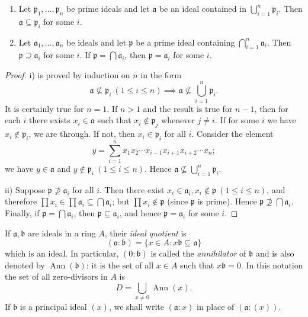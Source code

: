 \begin{proposition}\label{pro:prime avoidance}
\begin{enumerate}
    \item[i)] Let $\mathfrak{p}_1, \ldots, \mathfrak{p}_n$ be prime ideals and let $\mathfrak{a}$ be an ideal contained in $\bigcup_{i=1}^{n} \mathfrak{p}_i$. Then $\mathfrak{a} \subseteq \mathfrak{p}_i$ for some $i$.
    \item[ii)] Let $\mathfrak{a}_1, \ldots, \mathfrak{a}_n$ be ideals and let $\mathfrak{p}$ be a prime ideal containing $\bigcap_{i=1}^{n} \mathfrak{a}_i$. Then $\mathfrak{p} \supseteq \mathfrak{a}_i$ for some $i$. If $\mathfrak{p} = \bigcap \mathfrak{a}_i$, then $\mathfrak{p} = \mathfrak{a}_i$ for some $i$.
\end{enumerate}
\end{proposition}

\begin{proof}
i) is proved by induction on $n$ in the form
\[
\mathfrak{a} \not\subseteq \mathfrak{p}_i\ (1 \le i \le n) \implies \mathfrak{a} \not\subseteq \bigcup_{i=1}^{n} \mathfrak{p}_i.
\]
It is certainly true for $n = 1$. If $n > 1$ and the result is true for $n - 1$, then for each $i$ there exists $x_i \in \mathfrak{a}$ such that $x_i \notin \mathfrak{p}_j$ whenever $j \neq i$. If for some $i$ we have $x_i \notin \mathfrak{p}_i$, we are through. If not, then $x_i \in \mathfrak{p}_i$ for all $i$. Consider the element
\[
y = \sum_{i=1}^{n} x_1 x_2 \cdots x_{i-1} x_{i+1} x_{i+2} \cdots x_n;
\]
we have $y \in \mathfrak{a}$ and $y \notin \mathfrak{p}_i\ (1 \le i \le n)$. Hence $\mathfrak{a} \not\subseteq \bigcup_{i=1}^{n} \mathfrak{p}_i$.

ii) Suppose $\mathfrak{p} \not\supseteq \mathfrak{a}_i$ for all $i$. Then there exist $x_i \in \mathfrak{a}_i, x_i \notin \mathfrak{p}\ (1 \le i \le n)$, and therefore $\prod x_i \in \prod \mathfrak{a}_i \subseteq \bigcap \mathfrak{a}_i$; but $\prod x_i \notin \mathfrak{p}$ (since $\mathfrak{p}$ is prime). Hence $\mathfrak{p} \not\supseteq \bigcap \mathfrak{a}_i$. Finally, if $\mathfrak{p} = \bigcap \mathfrak{a}_i$, then $\mathfrak{p} \subseteq \mathfrak{a}_i$, and hence $\mathfrak{p} = \mathfrak{a}_i$ for some $i$.
\end{proof}

If $\mathfrak{a}, \mathfrak{b}$ are ideals in a ring $A$, their \emph{ideal quotient} is
\[
(\mathfrak{a} : \mathfrak{b}) = \{x \in A : x\mathfrak{b} \subseteq \mathfrak{a}\}
\]
which is an ideal. In particular, $(0 : \mathfrak{b})$ is called the \emph{annihilator} of $\mathfrak{b}$ and is also denoted by $\operatorname{Ann}(\mathfrak{b})$: it is the set of all $x \in A$ such that $x\mathfrak{b} = 0$. In this notation the set of all zero-divisors in $A$ is
\[
D = \bigcup_{x \neq 0} \operatorname{Ann}(x).
\]
If $\mathfrak{b}$ is a principal ideal $(x)$, we shall write $(\mathfrak{a} : x)$ in place of $(\mathfrak{a} : (x))$.

